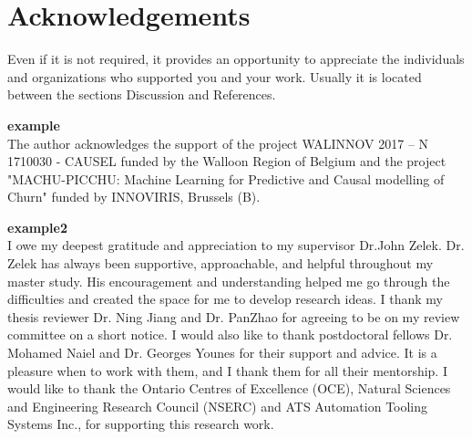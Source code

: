 \chapter*{Acknowledgements}
Even if it is not required, it provides an opportunity to appreciate the individuals and organizations who supported you and your work. Usually it is located between the sections Discussion and References.

\textbf{example}\\
The author acknowledges the support of the project WALINNOV
2017 – N 1710030 - CAUSEL funded by the Walloon
Region of Belgium and the project "MACHU-PICCHU: Machine
Learning for Predictive and Causal modelling of Churn"
funded by INNOVIRIS, Brussels (B).

\textbf{example2}\\
I owe my deepest gratitude and appreciation to my supervisor Dr.John Zelek. Dr. Zelek
has always been supportive, approachable, and helpful throughout my master study. His
encouragement and understanding helped me go through the difficulties and created the
space for me to develop research ideas. I thank my thesis reviewer Dr. Ning Jiang and Dr.
PanZhao for agreeing to be on my review committee on a short notice.
I would also like to thank postdoctoral fellows Dr. Mohamed Naiel and Dr. Georges
Younes for their support and advice. It is a pleasure when to work with them, and I thank
them for all their mentorship.
I would like to thank the Ontario Centres of Excellence (OCE), Natural Sciences and
Engineering Research Council (NSERC) and ATS Automation Tooling Systems Inc., for
supporting this research work.